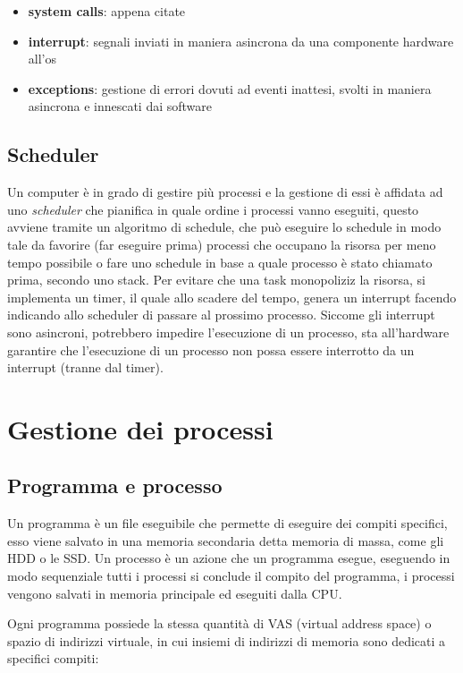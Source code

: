 \documentclass{article}
\begin{document}
        \begin{itemize}
            \item \textbf{system calls}:
                appena citate
                
            \item \textbf{interrupt}:
                segnali inviati in maniera asincrona da una componente hardware all'os

            \item \textbf{exceptions}:
                gestione di errori dovuti ad eventi inattesi, svolti in maniera asincrona e innescati dai software
        \end{itemize}
%
    \subsection{Scheduler}
        Un computer è in grado di gestire più processi e la gestione di essi è affidata ad uno \textit{scheduler} che pianifica in quale ordine i processi vanno eseguiti, questo avviene tramite un algoritmo di schedule, che può eseguire lo schedule in modo tale da favorire (far eseguire prima) processi che occupano la risorsa per meno tempo possibile o fare uno schedule in base a quale processo è stato chiamato prima, secondo uno stack.
        Per evitare che una task monopoliziz la risorsa, si implementa un timer, il quale allo scadere del tempo, genera un interrupt facendo indicando allo scheduler di passare al prossimo processo.
        Siccome gli interrupt sono asincroni, potrebbero impedire l'esecuzione di un processo, sta all'hardware garantire che l'esecuzione di un processo non possa essere interrotto da un interrupt (tranne dal timer).

\newpage

\section{Gestione dei processi}
    \subsection{Programma e processo}
        \begin{tcolorbox}[colback= green!10!white, colframe= green!40!black, title=Definizione programmi e processi]
            Un programma è un file eseguibile che permette di eseguire dei compiti specifici, esso viene salvato in una memoria secondaria detta memoria di massa, come gli HDD o le SSD.
            Un processo è un azione che un programma esegue, eseguendo in modo sequenziale tutti i processi si conclude il compito del programma, i processi vengono salvati in memoria principale ed eseguiti dalla CPU. 
            
        \end{tcolorbox}
        Ogni programma possiede la stessa quantità di VAS (virtual address space) o spazio di indirizzi virtuale, in cui insiemi di indirizzi di memoria sono dedicati a specifici compiti:
        
\end{document}
